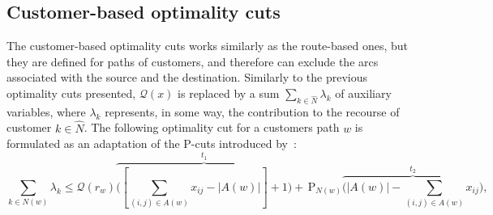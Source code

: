 \documentclass[11pt]{article}
\theoremstyle{definition}
\begin{document}
\subsection{Customer-based optimality cuts}
\label{ssec:customer-based}


The customer-based optimality cuts works similarly as the route-based ones, but they are defined for paths of customers, and therefore can exclude the arcs associated with the source and the destination.
Similarly to the previous optimality cuts presented, $\mathcal{Q}(x)$ is replaced by a sum $\sum_{k \in \hat{N}} \lambda_k$ of auxiliary variables, where $\lambda_k$ represents, in some way, the contribution to the recourse of customer $k \in \hat N$.
%
%
%
The following optimality cut for a customers path $w$ is formulated as an adaptation of the P-cuts introduced by~\citet{Lucas2024}:
%
\begin{equation}
  \label{eq:optcuts3}
  \sum_{k \in N(w)} \lambda_k \leq \mathcal{Q}(r_w) \overbrace{\Biggl(\left [\sum_{(i,j) \in A(w)} x_{ij} - |A(w)|\right ] + 1 \Biggl)}^{t_1} + \, \text{P}_{N(w)} \overbrace{\Biggl( |A(w)| - \sum_{(i,j) \in A(w)} x_{ij} \Biggl)}^{t_2},
\end{equation}
\end{document}
